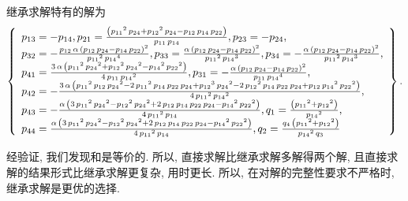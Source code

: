 继承求解特有的解为 
\begin{equation}
\def\arraystretch{1.2}
\left\{
\begin{array}{l}
{{p}_{13}}=-{{p}_{14}},
{{p}_{21}}=\frac{\left( {{{p}_{11}}}^{2}\,{{p}_{24}}+{{{p}_{12}}}^{2}\,{{p}_{24}}-{{p}_{12}}\,{{p}_{14}}\,{{p}_{22}}\right) }{{{p}_{11}}\,{{p}_{14}}},
{{p}_{23}}=-{{p}_{24}},\\
{{p}_{32}}=-\frac{{{p}_{12}}\,\alpha\,\left( {{p}_{12}}\,{{p}_{24}}-{{p}_{14}}\,{{p}_{22}}\right) ^{2}}{{{{p}_{11}}}^{2}\,{{{p}_{14}}}^{4}},
{{p}_{33}}=\frac{\alpha\,\left( {{p}_{12}}\,{{p}_{24}}-{{p}_{14}}\,{{p}_{22}}\right) ^{2}}{{{{p}_{11}}}^{2}\,{{{p}_{14}}}^{3}},
{{p}_{34}}=-\frac{\alpha\,\left( {{p}_{12}}\,{{p}_{24}}-{{p}_{14}}\,{{p}_{22}}\right) ^{2}}{{{{p}_{11}}}^{2}\,{{{p}_{14}}}^{3}},\\
{{p}_{41}}=\frac{3\,\alpha\,\left( {{{p}_{11}}}^{2}\,{{{p}_{24}}}^{2}+{{{p}_{12}}}^{2}\,{{{p}_{24}}}^{2}-{{{p}_{14}}}^{2}\,{{{p}_{22}}}^{2}\right) }{4\,{{p}_{11}}\,{{{p}_{14}}}^{2}},
{{p}_{31}}=-\frac{\alpha\,\left( {{p}_{12}}\,{{p}_{24}}-{{p}_{14}}\,{{p}_{22}}\right) ^{2}}{{{p}_{11}}\,{{{p}_{14}}}^{4}},\\
{{p}_{42}}=-\frac{3\,\alpha\,\left( {{{p}_{11}}}^{2}\,{{p}_{12}}\,{{{p}_{24}}}^{2}-2\,{{{p}_{11}}}^{2}\,{{p}_{14}}\,{{p}_{22}}\,{{p}_{24}}+{{{p}_{12}}}^{3}\,{{{p}_{24}}}^{2}-2\,{{{p}_{12}}}^{2}\,{{p}_{14}}\,{{p}_{22}}\,{{p}_{24}}+{{p}_{12}}\,{{{p}_{14}}}^{2}\,{{{p}_{22}}}^{2}\right) }{4\,{{{p}_{11}}}^{2}\,{{{p}_{14}}}^{2}},\\ 
{{p}_{43}}=-\frac{\alpha\,\left( 3\,{{{p}_{11}}}^{2}\,{{{p}_{24}}}^{2}-{{{p}_{12}}}^{2}\,{{{p}_{24}}}^{2}+2\,{{p}_{12}}\,{{p}_{14}}\,{{p}_{22}}\,{{p}_{24}}-{{{p}_{14}}}^{2}\,{{{p}_{22}}}^{2}\right) }{4\,{{{p}_{11}}}^{2}\,{{p}_{14}}},
{{q}_{1}}=\frac{\left( {{{p}_{11}}}^{2}+{{{p}_{12}}}^{2}\right) }{{{{p}_{14}}}^{2}},\\ 
{{p}_{44}}=\frac{\alpha\,\left( 3\,{{{p}_{11}}}^{2}\,{{{p}_{24}}}^{2}-{{{p}_{12}}}^{2}\,{{{p}_{24}}}^{2}+2\,{{p}_{12}}\,{{p}_{14}}\,{{p}_{22}}\,{{p}_{24}}-{{{p}_{14}}}^{2}\,{{{p}_{22}}}^{2}\right) }{4\,{{{p}_{11}}}^{2}\,{{p}_{14}}},
{{q}_{2}}=\frac{{{q}_{4}}\,\left( {{{p}_{11}}}^{2}+{{{p}_{12}}}^{2}\right) }{{{{p}_{14}}}^{2}\,{{q}_{3}}}
\end{array}
\right\}. \label{2S1L-plot}
\end{equation}

经验证, 我们发现和是等价的. 所以, 直接求解比继承求解多解得两个解, 且直接求解的结果形式比继承求解更复杂, 用时更长. 所以, 在对解的完整性要求不严格时, 继承求解是更优的选择.

